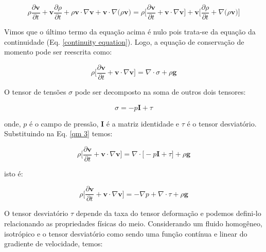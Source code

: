 \begin{equation}
 \rho \frac{\partial \textbf{v}}{\partial t}
 +
 \textbf{v} \frac{\partial \rho}{\partial t}
 +
 \rho \textbf{v} \cdot \nabla \textbf{v}
 + 
 \textbf{v} \cdot \nabla \big( \rho \textbf{v} \big)
 =
 \rho \Bigg[ \frac{\partial \textbf{v}}{\partial t} + \textbf{v} \cdot \nabla \textbf{v} \Bigg]
 +
 \textbf{v} \Bigg[ \frac{\partial \rho}{\partial t} + \nabla \big( \rho \textbf{v} \big) \Bigg]
\end{equation}

\newpage
Vimos que o último termo da equação acima
é nulo pois trata-se da equação da continuidade (Eq. \ref{continuity equation}).
Logo, a equação de conservação de momento pode ser reescrita como:

\begin{equation} \label{qm 3}
 \rho \Bigg[ \frac{\partial \textbf{v}}{\partial t} + \textbf{v} \cdot \nabla \textbf{v} \Bigg]
 =
 \nabla \cdot \sigma
 +
 \rho \textbf{g}
\end{equation}

\medskip
\noindent
O tensor de tensões $\sigma$ pode ser decomposto
na soma de outros dois tensores:

\begin{equation}
 \sigma = -p \textbf{I} + \tau
\end{equation}

\medskip
\noindent
onde, $p$ é o campo de pressão, \textbf{I} é a matriz identidade e
$\tau$ é o tensor desviatório. Substituindo na Eq. \ref{qm 3} temos:

\begin{equation}
 \rho \Bigg[ \frac{\partial \textbf{v}}{\partial t} + \textbf{v} \cdot \nabla \textbf{v} \Bigg]
 =
 \nabla \cdot \big[ -p \textbf{I} + \tau \big]
 +
 \rho \textbf{g}
\end{equation}

\medskip
\noindent
isto é:

\begin{equation} \label{qm 4}
 \rho \Bigg[ \frac{\partial \textbf{v}}{\partial t} + \textbf{v} \cdot \nabla \textbf{v} \Bigg]
 =
 -
 \nabla p
 +
 \nabla \cdot \tau
 +
 \rho \textbf{g}
\end{equation}

\medskip
O tensor desviatório $\tau$ depende da taxa do tensor deformação
e podemos defini-lo relacionando as propriedades físicas do meio.
Considerando um fluido homogêneo, isotrópico e
o tensor desviatório como sendo uma função contínua e linear do
gradiente de velocidade, temos:

